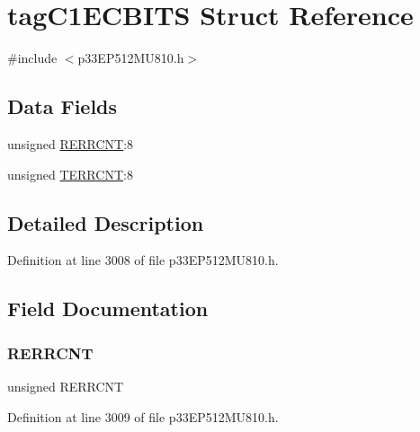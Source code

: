 \hypertarget{structtag_c1_e_c_b_i_t_s}{}\section{tag\+C1\+E\+C\+B\+I\+TS Struct Reference}
\label{structtag_c1_e_c_b_i_t_s}


{\ttfamily \#include $<$p33\+E\+P512\+M\+U810.\+h$>$}

\subsection*{Data Fields}
\begin{DoxyCompactItemize}
\item 
unsigned \hyperlink{structtag_c1_e_c_b_i_t_s_ad9ea27afc90da98d70dcad32d97c2071}{R\+E\+R\+R\+C\+NT}\+:8
\item 
unsigned \hyperlink{structtag_c1_e_c_b_i_t_s_a1581e101a719f30685a8534da9f84b32}{T\+E\+R\+R\+C\+NT}\+:8
\end{DoxyCompactItemize}


\subsection{Detailed Description}


Definition at line 3008 of file p33\+E\+P512\+M\+U810.\+h.



\subsection{Field Documentation}
\mbox{\label{structtag_c1_e_c_b_i_t_s_ad9ea27afc90da98d70dcad32d97c2071}} 
\subsubsection{\texorpdfstring{R\+E\+R\+R\+C\+NT}{RERRCNT}}
{\footnotesize\ttfamily unsigned R\+E\+R\+R\+C\+NT}



Definition at line 3009 of file p33\+E\+P512\+M\+U810.\+h.

\mbox{\label{structtag_c1_e_c_b_i_t_s_a1581e101a719f30685a8534da9f84b32}} 
